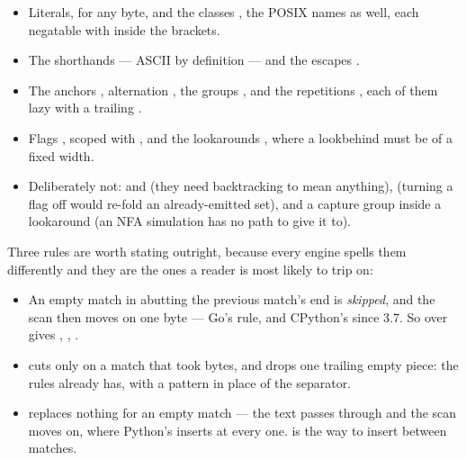 \begin{itemize}
\item Literals,  for any byte, and the classes \ic{[abc]}
  \ic{[\^{}a-z]} \ic{[[:alpha:]]}, the POSIX names  
       
        as well,
  each negatable with \ic{\^{}} inside the brackets.
\item The shorthands  
    
    
    --- ASCII by definition --- and the
  escapes   
    
    .
\item The anchors \ic{\^{}} \ic{\$}, alternation , the groups \ic{(}
  \ic{)}  , and the repetitions \ic{*} \ic{+} 
    , each of them lazy with a trailing
  .
\item Flags   , scoped with , and
  the lookarounds    , where a lookbehind
  must be of a fixed width.
\item Deliberately not:  and  (they need backtracking to
  mean anything),  (turning a flag off would re-fold an
  already-emitted set), and a capture group inside a lookaround (an NFA
  simulation has no path to give it to).
\end{itemize}

Three rules are worth stating outright, because every engine spells them
differently and they are the ones a reader is most likely to trip on:

\begin{itemize}
\item An empty match in  abutting the previous match's end is
  \emph{skipped}, and the scan then moves on one byte --- Go's rule, and
  CPython's since 3.7. So  over  gives , , .
\item {} cuts only on a match that took bytes, and drops one trailing
  empty piece: the rules  already has, with a pattern in place of
  the separator.
\item {} replaces nothing for an empty match --- the text passes
  through and the scan moves on, where Python's  inserts at every
  one.  is the way to insert between matches.
\end{itemize}

